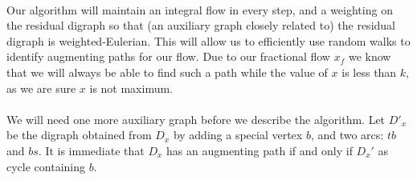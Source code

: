 \documentclass[letterpaper,12pt,oneside,onecolumn]{article}
\begin{document}
	\paragraph{}
	Our algorithm will maintain an integral flow in every step, and a weighting on the residual digraph so that (an auxiliary graph closely related to) the residual digraph is weighted-Eulerian. This will allow us to efficiently use random walks to identify augmenting paths for our flow. Due to our fractional flow $x_f$ we know that we will always be able to find such a path while the value of $x$ is less than $k$, as we are sure $x$ is not maximum.
	\paragraph{}
	We will need one more auxiliary graph before we describe the algorithm. Let $D'_x$ be the digraph obtained from $D_x$ by adding a special vertex $b$, and two arcs: $tb$ and $bs$. It is immediate that $D_x$ has an augmenting path if and only if $D_x'$ as cycle containing $b$.
\end{document}
